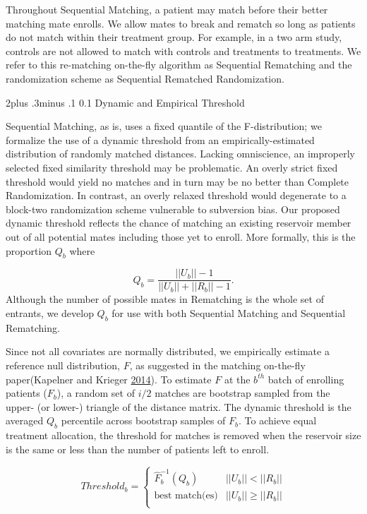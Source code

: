 \documentclass[12pt,oneside]{book}
\makeatletter
\newlength{\li}\setlength{\li}{14.48pt}
\newlength{\di}\setlength{\di}{-3.5mm}
\renewcommand\section{ \@startsection {section}{1}{\z@}%
    {2\@bls  plus .3\@bls minus .1\@bls}%
    {0.1\@bls}%
    {\centering\normalfont}}
\theoremstyle{definition}
\theoremstyle{definition}
\theoremstyle{definition}
\theoremstyle{remark}
\makeatother
\begin{document}
Throughout Sequential Matching, a patient may match before their better
matching mate enrolls. We allow mates to break and rematch so long as
patients do not match within their treatment group. For example, in a
two arm study, controls are not allowed to match with controls and
treatments to treatments. We refer to this re-matching on-the-fly
algorithm as Sequential Rematching and the randomization scheme as
Sequential Rematched Randomization.

\hypertarget{dynamic-and-empirical-threshold}{%
\section{Dynamic and Empirical
Threshold}\label{dynamic-and-empirical-threshold}}

Sequential Matching, as is, uses a fixed quantile of the F-distribution;
we formalize the use of a dynamic threshold from an
empirically-estimated distribution of randomly matched distances.
Lacking omniscience, an improperly selected fixed similarity threshold
may be problematic. An overly strict fixed threshold would yield no
matches and in turn may be no better than Complete Randomization. In
contrast, an overly relaxed threshold would degenerate to a block-two
randomization scheme vulnerable to subversion bias. Our proposed dynamic
threshold reflects the chance of matching an existing reservoir member
out of all potential mates including those yet to enroll. More formally,
this is the proportion \(Q_b\) where

\[
Q_b = \frac{||  U_b || - 1}{ ||U_b|| + ||R_b|| - 1}.
\] Although the number of possible mates in Rematching is the whole set
of entrants, we develop \(Q_b\) for use with both Sequential Matching
and Sequential Rematching.

Since not all covariates are normally distributed, we empirically
estimate a reference null distribution, \(F\), as suggested in the
matching on-the-fly paper(Kapelner and Krieger
\protect\hyperlink{ref-Kapelner:2014cu}{2014}). To estimate \(F\) at the
\(b^{th}\) batch of enrolling patients (\(F_b\)), a random set of
\(i/2\) matches are bootstrap sampled from the upper- (or lower-)
triangle of the distance matrix. The dynamic threshold is the averaged
\(Q_b\) percentile across bootstrap samples of \(F_b\). To achieve equal
treatment allocation, the threshold for matches is removed when the
reservoir size is the same or less than the number of patients left to
enroll.

\[
Threshold_b = \begin{cases} \hat{F}_b^{-1} (Q_b) &  || U_b || < || R_b || \\
                    \text{best match(es)}      &  || U_b || \ge || R_b || \\
      \end{cases}
\]
\end{document}

